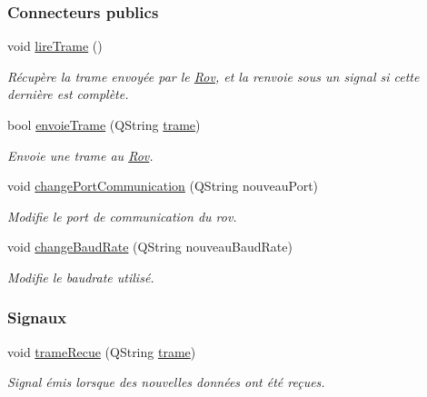 \subsubsection*{Connecteurs publics}
\begin{DoxyCompactItemize}
\item 
void \hyperlink{class_communication_rov_a5822d2f41553221ea876ea09e148f859}{lire\+Trame} ()
\begin{DoxyCompactList}\small\item\em Récupère la trame envoyée par le \hyperlink{class_rov}{Rov}, et la renvoie sous un signal si cette dernière est complète. \end{DoxyCompactList}\item 
bool \hyperlink{class_communication_rov_ac243fcfb073f4ceaf58fab1d41207801}{envoie\+Trame} (Q\+String \hyperlink{class_communication_rov_a7100b1be33860d235b45efd9010ac218}{trame})
\begin{DoxyCompactList}\small\item\em Envoie une trame au \hyperlink{class_rov}{Rov}. \end{DoxyCompactList}\item 
void \hyperlink{class_communication_rov_ad46397a58ba7704fbd5ac5748e083004}{change\+Port\+Communication} (Q\+String nouveau\+Port)
\begin{DoxyCompactList}\small\item\em Modifie le port de communication du rov. \end{DoxyCompactList}\item 
void \hyperlink{class_communication_rov_ac49ffc6f2e6ae22ea9f99e10ca0a4163}{change\+Baud\+Rate} (Q\+String nouveau\+Baud\+Rate)
\begin{DoxyCompactList}\small\item\em Modifie le baudrate utilisé. \end{DoxyCompactList}\end{DoxyCompactItemize}
\subsubsection*{Signaux}
\begin{DoxyCompactItemize}
\item 
void \hyperlink{class_communication_rov_add205822378629204a4ee49ca74c6d56}{trame\+Recue} (Q\+String \hyperlink{class_communication_rov_a7100b1be33860d235b45efd9010ac218}{trame})
\begin{DoxyCompactList}\small\item\em Signal émis lorsque des nouvelles données ont été reçues. \end{DoxyCompactList}\end{DoxyCompactItemize}

